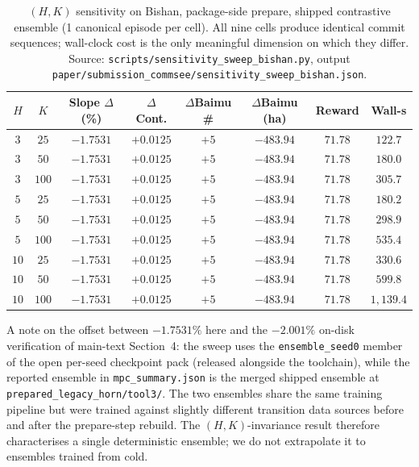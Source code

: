 \documentclass[11pt]{article}
\begin{document}
\begin{table}[htbp]
\centering
\small
\caption{$(H, K)$ sensitivity on Bishan, package-side prepare, shipped contrastive ensemble (1 canonical episode per cell). All nine cells produce identical commit sequences; wall-clock cost is the only meaningful dimension on which they differ. Source: \texttt{scripts/sensitivity\_sweep\_bishan.py}, output \texttt{paper/submission\_commsee/sensitivity\_sweep\_bishan.json}.}
\label{tab:si-hk-sweep}
\begin{tabular}{cccccccc}
\toprule
$H$ & $K$ & Slope $\Delta$ (\%) & $\Delta$Cont. & $\Delta$Baimu \# & $\Delta$Baimu (ha) & Reward & Wall-s \\
\midrule
$3$  & $25$  & $-1.7531$ & $+0.0125$ & $+5$ & $-483.94$ & $71.78$ & $122.7$ \\
$3$  & $50$  & $-1.7531$ & $+0.0125$ & $+5$ & $-483.94$ & $71.78$ & $180.0$ \\
$3$  & $100$ & $-1.7531$ & $+0.0125$ & $+5$ & $-483.94$ & $71.78$ & $305.7$ \\
$5$  & $25$  & $-1.7531$ & $+0.0125$ & $+5$ & $-483.94$ & $71.78$ & $180.2$ \\
$5$  & $50$  & $-1.7531$ & $+0.0125$ & $+5$ & $-483.94$ & $71.78$ & $298.9$ \\
$5$  & $100$ & $-1.7531$ & $+0.0125$ & $+5$ & $-483.94$ & $71.78$ & $535.4$ \\
$10$ & $25$  & $-1.7531$ & $+0.0125$ & $+5$ & $-483.94$ & $71.78$ & $330.6$ \\
$10$ & $50$  & $-1.7531$ & $+0.0125$ & $+5$ & $-483.94$ & $71.78$ & $599.8$ \\
$10$ & $100$ & $-1.7531$ & $+0.0125$ & $+5$ & $-483.94$ & $71.78$ & $1{,}139.4$ \\
\bottomrule
\end{tabular}
\end{table}

A note on the offset between $-1.7531\%$ here and the $-2.001\%$ on-disk verification of main-text Section~4: the sweep uses the \texttt{ensemble\_seed0} member of the open per-seed checkpoint pack (released alongside the toolchain), while the reported ensemble in \texttt{mpc\_summary.json} is the merged shipped ensemble at \texttt{prepared\_legacy\_horn/tool3/}. The two ensembles share the same training pipeline but were trained against slightly different transition data sources before and after the prepare-step rebuild. The $(H, K)$-invariance result therefore characterises a single deterministic ensemble; we do not extrapolate it to ensembles trained from cold.
\end{document}

